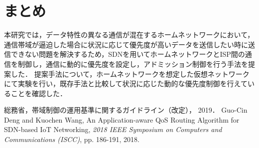 \documentclass[a4paper,10pt,twocolumn,uplatex]{jsarticle}
\begin{document}
\section{まとめ}
本研究では，データ特性の異なる通信が混在するホームネットワークにおいて，通信帯域が逼迫した場合に状況に応じて優先度が高いデータを送信したい時に送信できない問題を解決するため，SDNを用いてホームネットワークとISP間の通信を制御し，通信に動的に優先度を設定し，アドミッション制御を行う手法を提案した．
提案手法について，ホームネットワークを想定した仮想ネットワークにて実験を行い，既存手法と比較して状況に応じた動的な優先度制御を行えていることを確認した．

\footnotesize{
  \begin{thebibliography}{99}
     総務省，帯域制御の運用基準に関するガイドライン（改定）， 2019．
     Guo-Cin Deng and Kuochen Wang, An Application-aware QoS Routing Algorithm for SDN-based IoT Networking, \textit{2018 IEEE Symposium on Computers and Communications (ISCC)}, pp. 186-191, 2018.
  \end{thebibliography}
}

% 
% 

\end{document}
